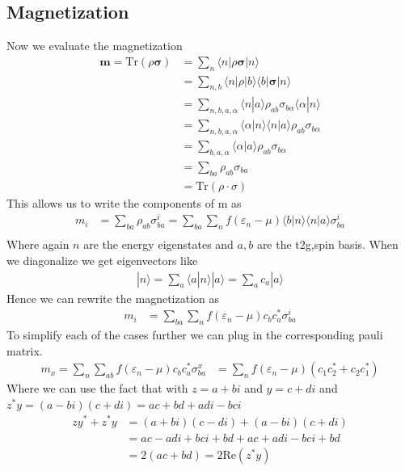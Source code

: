 \documentclass[11pt]{article}
\begin{document}
\subsection{Magnetization}
Now we evaluate the magnetization
\begin{align}
    \bm m = \text{Tr}(\rho \bm \sigma) &= \sum_n \langle n| \rho \bm \sigma |n\rangle \\\nonumber
    &= \sum_{n,b} \langle n|\rho|b\rangle\langle b| \bm \sigma |n\rangle \\\nonumber
    &= \sum_{n,b,a,\alpha}\langle n | a\rangle\rho_{ab} \sigma_{b\alpha} \langle \alpha | n \rangle \\\nonumber
    &= \sum_{n,b,a,\alpha}\langle \alpha | n \rangle\langle n | a\rangle\rho_{ab} \sigma_{b\alpha} \\\nonumber
    &= \sum_{b,a,\alpha}\langle \alpha | a\rangle\rho_{ab} \sigma_{b\alpha} \\\nonumber
    &= \sum_{ba}\rho_{ab}\sigma_{ba} \\\nonumber
    &= \text{Tr} (\rho \cdot \sigma)
\end{align}
This allows us to write the components of m as
\begin{align}
    m_i &= \sum_{ba}\rho_{ab}\sigma^i_{ba} = \sum_{ba}\sum_n f(\varepsilon_n - \mu) \langle b |n \rangle \langle n | a \rangle \sigma^i_{ba} \\\nonumber
\end{align}
Where again $n$ are the energy eigenstates and $a,b$ are the t2g,spin basis. When we diagonalize we get eigenvectors like
\begin{align}
    |n\rangle = \sum_{a} \langle a|n\rangle |a\rangle = \sum_a c_a |a\rangle
\end{align}
Hence we can rewrite the magnetization as
\begin{align}
    m_i &= \sum_{ba}\sum_n f(\varepsilon_n - \mu) c_b c_a^* \sigma^i_{ba}
\end{align}
To simplify each of the cases further we can plug in the corresponding pauli matrix.
\begin{align}
    m_x = \sum_n \sum_{ab} f(\varepsilon_n - \mu) c_b c_a^* \sigma^x_{ba} &= \sum_n f(\varepsilon_n - \mu) (c_1 c_2^* + c_2 c_1^*)
\end{align}
Where we can use the fact that with $z = a+bi$ and $y = c+di$ and  $z^*y = (a-bi)(c+di) = ac + bd + adi - bci$
\begin{align}
    zy^* + z^*y &= (a+bi)(c-di) + (a-bi)(c+di) \\\nonumber
    &= ac - adi + bci + bd + ac + adi - bci + bd \\\nonumber
    &= 2(ac + bd) = 2\text{Re} (z^*y)
\end{align}
\end{document}
